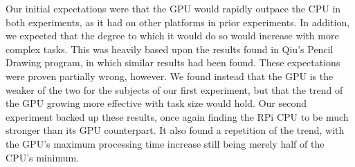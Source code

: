 \documentclass[conference]{IEEEtran}
\begin{document}
Our initial expectations were that the GPU would rapidly outpace the CPU in both experiments, as it had on other platforms in prior experiments. In addition, we expected that the degree to which it would do so would increase with more complex tasks. This was heavily based upon the results found in Qiu's Pencil Drawing program, in which similar results had been found. These expectations were proven partially wrong, however. We found instead that the GPU is the weaker of the two for the subjects of our first experiment, but that the trend of the GPU growing more effective with task size would hold. Our second experiment backed up these results, once again finding the RPi CPU to be much stronger than its GPU counterpart. It also found a repetition of the trend, with the GPU's maximum processing time increase still being merely half of the CPU's minimum. 


\end{document}
